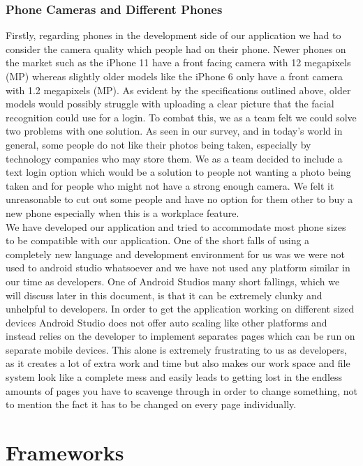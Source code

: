 \subsection{Phone Cameras and Different Phones}
Firstly, regarding phones in the development side of our application we had to consider the camera quality which people had on their phone. Newer phones on the market such as the iPhone 11 \cite{iPhone11} have a front facing camera with 12 megapixels (MP) whereas slightly older models like the iPhone 6 only have a front camera with 1.2 megapixels \cite{iPhone6} (MP). As evident by the specifications outlined above, older models would possibly struggle with uploading a clear picture that the facial recognition could use for a login. To combat this, we as a team felt we could solve two problems with one solution. As seen in our survey, and in today’s world in general, some people do not like their photos being taken, especially by technology companies who may store them. We as a team decided to include a text login option which would be a solution to people not wanting a photo being taken and for people who might not have a strong enough camera. We felt it unreasonable to cut out some people and have no option for them other to buy a new phone especially when this is a workplace feature.
\\
We have developed our application and tried to accommodate most phone sizes to be compatible with our application. One of the short falls of using a completely new language and development environment for us was we were not used to android studio whatsoever and we have not used any platform similar in our time as developers. One of Android Studios many short fallings, which we will discuss later in this document, is that it can be extremely clunky and unhelpful to developers. In order to get the application working on different sized devices Android Studio does not offer auto scaling like other platforms and instead relies on the developer to implement separates pages which can be run on separate mobile devices. This alone is extremely frustrating to us as developers, as it creates a lot of extra work and time but also makes our work space and file system look like a complete mess and easily leads to getting lost in the endless amounts of pages you have to scavenge through in order to change something, not to mention the fact it has to be changed on every page individually.
\\

\chapter{Frameworks}
